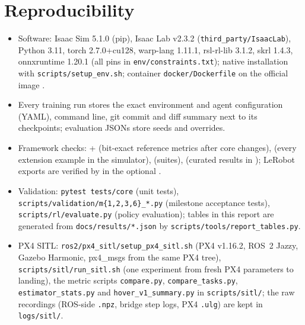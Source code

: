 \documentclass[11pt,a4paper]{article}
\begin{document}
\section{Reproducibility}
\begin{itemize}
\item Software: Isaac Sim 5.1.0 (pip), Isaac Lab v2.3.2 (\texttt{third\_party/IsaacLab}), Python 3.11, torch 2.7.0+cu128,
warp-lang 1.11.1, rsl-rl-lib 3.1.2, skrl 1.4.3, onnxruntime 1.20.1 (all pins in \texttt{env/constraints.txt});
native installation with \texttt{scripts/setup\_env.sh}; container \texttt{docker/Dockerfile} on the
official image .
\item Every training run stores the exact environment and agent configuration (YAML), command line, git commit and
diff summary next to its checkpoints; evaluation JSONs store seeds and overrides.
\item Framework checks:  +  (bit-exact
reference metrics after core changes),  (every extension example in the
simulator),  (suites), 
(curated results in ); LeRobot exports are verified by
 in the optional .
\item Validation: \texttt{pytest tests/core} (unit tests), \texttt{scripts/validation/m\{1,2,3,6\}\_*.py} (milestone
acceptance tests), \texttt{scripts/rl/evaluate.py} (policy evaluation); tables in this report are generated from
\texttt{docs/results/*.json} by \texttt{scripts/tools/report\_tables.py}.
\item PX4 SITL: \texttt{ros2/px4\_sitl/setup\_px4\_sitl.sh} (PX4 v1.16.2, ROS~2 Jazzy, Gazebo Harmonic, px4\_msgs from
the same PX4 tree), \texttt{scripts/sitl/run\_sitl.sh} (one experiment from fresh PX4 parameters to landing),
the metric scripts \texttt{compare.py}, \texttt{compare\_tasks.py}, \texttt{estimator\_stats.py} and
\texttt{hover\_v1\_summary.py} in \texttt{scripts/sitl/}; the raw
recordings (ROS-side \texttt{.npz}, bridge step logs, PX4 \texttt{.ulg}) are kept in \texttt{logs/sitl/}.
\end{itemize}
\end{document}
